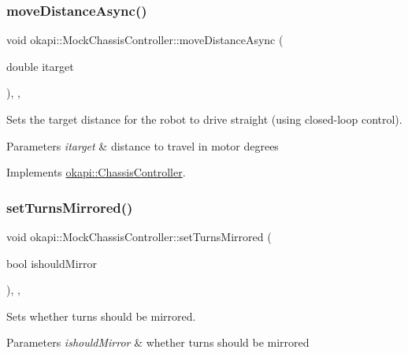 \subsubsection{\texorpdfstring{moveDistanceAsync()}{moveDistanceAsync()}\hspace{0.1cm}{\footnotesize\ttfamily [2/2]}}
{\footnotesize\ttfamily void okapi\+::\+Mock\+Chassis\+Controller\+::move\+Distance\+Async (\begin{DoxyParamCaption}\item[{double}]{itarget }\end{DoxyParamCaption})\hspace{0.3cm}{\ttfamily [inline]}, {\ttfamily [override]}, {\ttfamily [virtual]}}



Sets the target distance for the robot to drive straight (using closed-\/loop control). 


\begin{DoxyParams}{Parameters}
{\em itarget} & distance to travel in motor degrees \\
\hline
\end{DoxyParams}


Implements \mbox{\hyperlink{classokapi_1_1ChassisController_a24b46ec1c42f32c0527d57738a07820a}{okapi\+::\+Chassis\+Controller}}.

\mbox{\label{classokapi_1_1MockChassisController_a3781df1ee6cd8fc94c2a3c8bc19986a0}} 
\subsubsection{\texorpdfstring{setTurnsMirrored()}{setTurnsMirrored()}}
{\footnotesize\ttfamily void okapi\+::\+Mock\+Chassis\+Controller\+::set\+Turns\+Mirrored (\begin{DoxyParamCaption}\item[{bool}]{ishould\+Mirror }\end{DoxyParamCaption})\hspace{0.3cm}{\ttfamily [inline]}, {\ttfamily [override]}, {\ttfamily [virtual]}}



Sets whether turns should be mirrored. 


\begin{DoxyParams}{Parameters}
{\em ishould\+Mirror} & whether turns should be mirrored \\
\hline
\end{DoxyParams}


